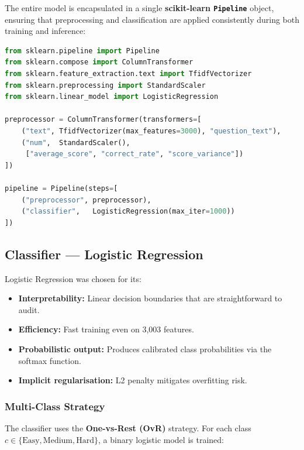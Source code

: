 \documentclass[12pt, a4paper, twoside]{article}
\newcommand{\code}[1]{\texttt{#1}}
\begin{document}
The entire model is encapsulated in a single \textbf{scikit-learn
\code{Pipeline}} object, ensuring that preprocessing and
classification are applied consistently during both training and
inference:

\begin{lstlisting}[language=Python,
  caption={Model pipeline definition (\code{retrain.py}).}]
from sklearn.pipeline import Pipeline
from sklearn.compose import ColumnTransformer
from sklearn.feature_extraction.text import TfidfVectorizer
from sklearn.preprocessing import StandardScaler
from sklearn.linear_model import LogisticRegression

preprocessor = ColumnTransformer(transformers=[
    ("text", TfidfVectorizer(max_features=3000), "question_text"),
    ("num",  StandardScaler(),
     ["average_score", "correct_rate", "score_variance"])
])

pipeline = Pipeline(steps=[
    ("preprocessor", preprocessor),
    ("classifier",   LogisticRegression(max_iter=1000))
])
\end{lstlisting}

\subsection{Classifier --- Logistic Regression}

Logistic Regression was chosen for its:

\begin{itemize}[leftmargin=2em]
    \item \textbf{Interpretability:} Linear decision boundaries that
          are straightforward to audit.
    \item \textbf{Efficiency:} Fast training even on 3{,}003 features.
    \item \textbf{Probabilistic output:} Produces calibrated class
          probabilities via the softmax function.
    \item \textbf{Implicit regularisation:} L2 penalty mitigates
          overfitting risk.
\end{itemize}

\subsubsection{Multi-Class Strategy}

The classifier uses the \textbf{One-vs-Rest (OvR)} strategy. For each
class $c \in \{\text{Easy}, \text{Medium}, \text{Hard}\}$, a binary
logistic model is trained:
\end{document}
